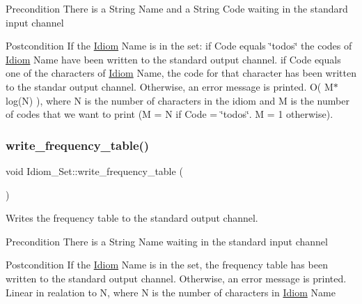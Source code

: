 \begin{DoxyPrecond}{Precondition}
There is a String Name and a String Code waiting in the standard input channel 
\end{DoxyPrecond}
\begin{DoxyPostcond}{Postcondition}
If the \hyperlink{classIdiom}{Idiom} Name is in the set\+: if Code equals \char`\"{}todos\char`\"{} the codes of \hyperlink{classIdiom}{Idiom} Name have been written to the standard output channel. if Code equals one of the characters of \hyperlink{classIdiom}{Idiom} Name, the code for that character has been written to the standar output channel. Otherwise, an error message is printed.  O( M$\ast$log(\+N) ), where N is the number of characters in the idiom and M is the number of codes that we want to print (M = N if Code = \char`\"{}todos\char`\"{}. M = 1 otherwise). 
\end{DoxyPostcond}
\mbox{\label{classIdiom__Set_a3b1a40b2c4968b0cab60070f9dcca4d2}} 
\subsubsection{\texorpdfstring{write\+\_\+frequency\+\_\+table()}{write\_frequency\_table()}}
{\footnotesize\ttfamily void Idiom\+\_\+\+Set\+::write\+\_\+frequency\+\_\+table (\begin{DoxyParamCaption}{ }\end{DoxyParamCaption})}



Writes the frequency table to the standard output channel. 

\begin{DoxyPrecond}{Precondition}
There is a String Name waiting in the standard input channel 
\end{DoxyPrecond}
\begin{DoxyPostcond}{Postcondition}
If the \hyperlink{classIdiom}{Idiom} Name is in the set, the frequency table has been written to the standard output channel. Otherwise, an error message is printed.  Linear in realation to N, where N is the number of characters in \hyperlink{classIdiom}{Idiom} Name 
\end{DoxyPostcond}
\mbox{\label{classIdiom__Set_aca59902e54a6d5d39de5df7ebf8f8560}} 
